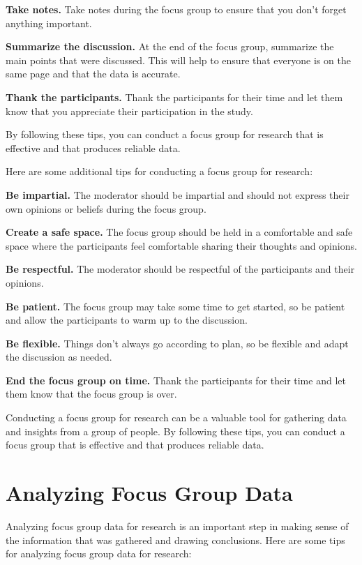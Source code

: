 \documentclass[
  b5paper]{book}
\begin{document}
\textbf{Take notes.} Take notes during the focus group to ensure that you don't forget anything important.

\textbf{Summarize the discussion.} At the end of the focus group, summarize the main points that were discussed. This will help to ensure that everyone is on the same page and that the data is accurate.

\textbf{Thank the participants.} Thank the participants for their time and let them know that you appreciate their participation in the study.

By following these tips, you can conduct a focus group for research that is effective and that produces reliable data.

Here are some additional tips for conducting a focus group for research:

\textbf{Be impartial.} The moderator should be impartial and should not express their own opinions or beliefs during the focus group.

\textbf{Create a safe space.} The focus group should be held in a comfortable and safe space where the participants feel comfortable sharing their thoughts and opinions.

\textbf{Be respectful.} The moderator should be respectful of the participants and their opinions.

\textbf{Be patient.} The focus group may take some time to get started, so be patient and allow the participants to warm up to the discussion.

\textbf{Be flexible.} Things don't always go according to plan, so be flexible and adapt the discussion as needed.

\textbf{End the focus group on time.} Thank the participants for their time and let them know that the focus group is over.

Conducting a focus group for research can be a valuable tool for gathering data and insights from a group of people. By following these tips, you can conduct a focus group that is effective and that produces reliable data.

\hypertarget{analyzing-focus-group-data}{%
\section{Analyzing Focus Group Data}\label{analyzing-focus-group-data}}

Analyzing focus group data for research is an important step in making sense of the information that was gathered and drawing conclusions. Here are some tips for analyzing focus group data for research:
\end{document}
